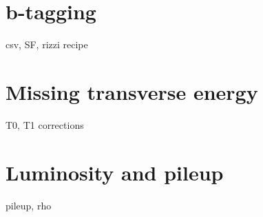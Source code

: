 \section{b-tagging}

csv, SF, rizzi recipe

\section{Missing transverse energy}

T0, T1 corrections

\section{Luminosity and pileup}

pileup, rho
